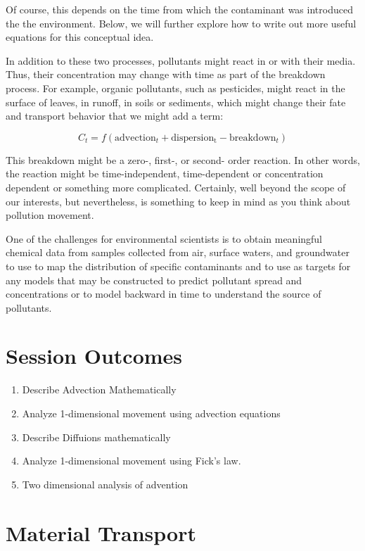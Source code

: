 \documentclass{tufte-handout}\usepackage[]{graphicx}\usepackage[]{color}
\begin{document}
Of course, this depends on the time from which the contaminant was introduced the the environment. Below, we will further explore how to write out more useful equations for this conceptual idea.

In addition to these two processes, pollutants might react in or with their media. Thus, their concentration may change with time as part of the breakdown process. For example, organic pollutants, such as pesticides, might react in the surface of leaves, in runoff, in soils or sediments, which might change their fate and transport behavior that we might add a term: 

\begin{equation}
C_t = f(\mathrm{advection}_t + \mathrm{dispersion_t} - \mathrm{breakdown}_t)
\end{equation}

This breakdown might be a zero-, first-, or second- order reaction. In other words, the reaction might be time-independent, time-dependent or concentration dependent or something more complicated. Certainly, well beyond the scope of our interests, but nevertheless, is something to keep in mind as you think about pollution movement. 

One of the challenges for environmental scientists is to obtain meaningful chemical data from samples collected from air, surface waters, and groundwater to use to map the distribution of specific contaminants and to use as targets for any models that may be constructed to predict pollutant spread and concentrations or to model backward in time to understand the source of pollutants. 

\section{Session Outcomes}
\begin{enumerate}
	\item Describe Advection Mathematically
	\item Analyze 1-dimensional movement using advection equations
	\item Describe Diffuions mathematically
	\item Analyze 1-dimensional movement using Fick's law.
	\item Two dimensional analysis of advention
\end{enumerate}

\section{Material Transport}
\end{document}
